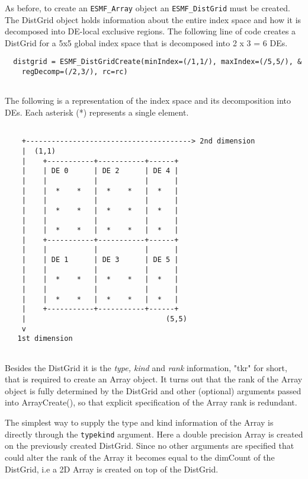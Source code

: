    As before, to create an {\tt ESMF\_Array} object an {\tt ESMF\_DistGrid}
   must be created. The DistGrid object holds information about the entire 
   index space and how it is decomposed into DE-local exclusive regions. The 
   following line of code creates a DistGrid for a 5x5 global index space that 
   is decomposed into 2 x 3 = 6 DEs. 

 \begin{verbatim}
  distgrid = ESMF_DistGridCreate(minIndex=(/1,1/), maxIndex=(/5,5/), &
    regDecomp=(/2,3/), rc=rc)
 
\end{verbatim}
 

   The following is a representation of the index space and its decomposition into
   DEs. Each asterisk (*) represents a single element.
  
   \begin{verbatim}
   
    +---------------------------------------> 2nd dimension
    |  (1,1)
    |    +-----------+-----------+------+
    |    | DE 0      | DE 2      | DE 4 |
    |    |           |           |      |
    |    |  *    *   |  *    *   |  *   |
    |    |           |           |      |
    |    |  *    *   |  *    *   |  *   |
    |    |           |           |      |
    |    |  *    *   |  *    *   |  *   |
    |    +-----------+-----------+------+
    |    |           |           |      |
    |    | DE 1      | DE 3      | DE 5 |
    |    |           |           |      |
    |    |  *    *   |  *    *   |  *   |
    |    |           |           |      |
    |    |  *    *   |  *    *   |  *   |
    |    +-----------+-----------+------+
    |                                 (5,5)
    v 
   1st dimension
  
   \end{verbatim}
  
   Besides the DistGrid it is the {\em type, kind} and {\em rank} information,
   "tkr" for short, that is required to create an Array object. It turns out that
   the rank of the Array object is fully determined by the DistGrid and other 
   (optional) arguments passed into ArrayCreate(), so that explicit 
   specification of the Array rank is redundant.
  
   The simplest way to supply the type and kind information of the Array is
   directly through the {\tt typekind} argument. Here a double precision Array
   is created on the previously created DistGrid. Since no other arguments are
   specified that could alter the rank of the Array it becomes equal to the 
   dimCount of the DistGrid, i.e a 2D Array is created on top of the DistGrid. 

